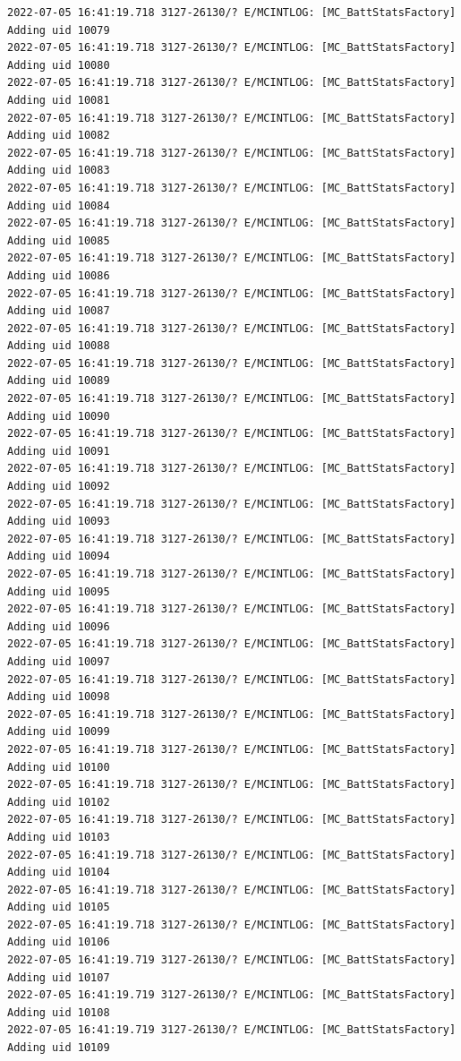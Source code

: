 \documentclass[a4paper,12pt]{book}
\begin{document}
\begin{lstlisting}
2022-07-05 16:41:19.718 3127-26130/? E/MCINTLOG: [MC_BattStatsFactory] Adding uid 10079
2022-07-05 16:41:19.718 3127-26130/? E/MCINTLOG: [MC_BattStatsFactory] Adding uid 10080
2022-07-05 16:41:19.718 3127-26130/? E/MCINTLOG: [MC_BattStatsFactory] Adding uid 10081
2022-07-05 16:41:19.718 3127-26130/? E/MCINTLOG: [MC_BattStatsFactory] Adding uid 10082
2022-07-05 16:41:19.718 3127-26130/? E/MCINTLOG: [MC_BattStatsFactory] Adding uid 10083
2022-07-05 16:41:19.718 3127-26130/? E/MCINTLOG: [MC_BattStatsFactory] Adding uid 10084
2022-07-05 16:41:19.718 3127-26130/? E/MCINTLOG: [MC_BattStatsFactory] Adding uid 10085
2022-07-05 16:41:19.718 3127-26130/? E/MCINTLOG: [MC_BattStatsFactory] Adding uid 10086
2022-07-05 16:41:19.718 3127-26130/? E/MCINTLOG: [MC_BattStatsFactory] Adding uid 10087
2022-07-05 16:41:19.718 3127-26130/? E/MCINTLOG: [MC_BattStatsFactory] Adding uid 10088
2022-07-05 16:41:19.718 3127-26130/? E/MCINTLOG: [MC_BattStatsFactory] Adding uid 10089
2022-07-05 16:41:19.718 3127-26130/? E/MCINTLOG: [MC_BattStatsFactory] Adding uid 10090
2022-07-05 16:41:19.718 3127-26130/? E/MCINTLOG: [MC_BattStatsFactory] Adding uid 10091
2022-07-05 16:41:19.718 3127-26130/? E/MCINTLOG: [MC_BattStatsFactory] Adding uid 10092
2022-07-05 16:41:19.718 3127-26130/? E/MCINTLOG: [MC_BattStatsFactory] Adding uid 10093
2022-07-05 16:41:19.718 3127-26130/? E/MCINTLOG: [MC_BattStatsFactory] Adding uid 10094
2022-07-05 16:41:19.718 3127-26130/? E/MCINTLOG: [MC_BattStatsFactory] Adding uid 10095
2022-07-05 16:41:19.718 3127-26130/? E/MCINTLOG: [MC_BattStatsFactory] Adding uid 10096
2022-07-05 16:41:19.718 3127-26130/? E/MCINTLOG: [MC_BattStatsFactory] Adding uid 10097
2022-07-05 16:41:19.718 3127-26130/? E/MCINTLOG: [MC_BattStatsFactory] Adding uid 10098
2022-07-05 16:41:19.718 3127-26130/? E/MCINTLOG: [MC_BattStatsFactory] Adding uid 10099
2022-07-05 16:41:19.718 3127-26130/? E/MCINTLOG: [MC_BattStatsFactory] Adding uid 10100
2022-07-05 16:41:19.718 3127-26130/? E/MCINTLOG: [MC_BattStatsFactory] Adding uid 10102
2022-07-05 16:41:19.718 3127-26130/? E/MCINTLOG: [MC_BattStatsFactory] Adding uid 10103
2022-07-05 16:41:19.718 3127-26130/? E/MCINTLOG: [MC_BattStatsFactory] Adding uid 10104
2022-07-05 16:41:19.718 3127-26130/? E/MCINTLOG: [MC_BattStatsFactory] Adding uid 10105
2022-07-05 16:41:19.718 3127-26130/? E/MCINTLOG: [MC_BattStatsFactory] Adding uid 10106
2022-07-05 16:41:19.719 3127-26130/? E/MCINTLOG: [MC_BattStatsFactory] Adding uid 10107
2022-07-05 16:41:19.719 3127-26130/? E/MCINTLOG: [MC_BattStatsFactory] Adding uid 10108
2022-07-05 16:41:19.719 3127-26130/? E/MCINTLOG: [MC_BattStatsFactory] Adding uid 10109

\end{lstlisting}
\end{document}

